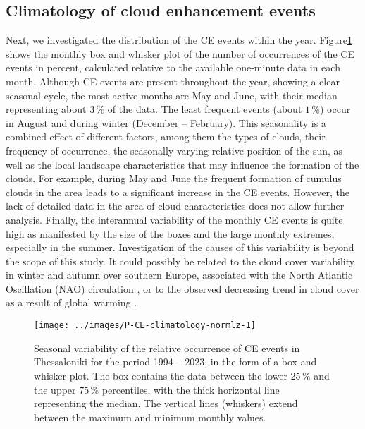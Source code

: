 \documentclass[preprint, 5p,
authoryear]{elsarticle} %
\begin{document}
\hypertarget{climatology-of-cloud-enhancement-events}{%
\subsection{Climatology of cloud enhancement
events}\label{climatology-of-cloud-enhancement-events}}

Next, we investigated the distribution of the CE events within the year.
Figure\nobreakspace{}\ref{fig:relative-month-occurrences} shows the
monthly box and whisker plot of the number of occurrences of the CE
events in percent, calculated relative to the available one-minute data
in each month. Although CE events are present throughout the year,
showing a clear seasonal cycle, the most active months are May and June,
with their median representing about \(3\,\%\) of the data. The least
frequent events (about \(1\,\%\)) occur in August and during winter
(December -- February). This seasonality is a combined effect of
different factors, among them the types of clouds, their frequency of
occurrence, the seasonally varying relative position of the sun, as well
as the local landscape characteristics that may influence the formation
of the clouds. For example, during May and June the frequent formation
of cumulus clouds in the area leads to a significant increase in the CE
events. However, the lack of detailed data in the area of cloud
characteristics does not allow further analysis. Finally, the
interannual variability of the monthly CE events is quite high as
manifested by the size of the boxes and the large monthly extremes,
especially in the summer. Investigation of the causes of this
variability is beyond the scope of this study. It could possibly be
related to the cloud cover variability in winter and autumn over
southern Europe, associated with the North Atlantic Oscillation (NAO)
circulation \citep{Chiacchio2010}, or to the observed decreasing trend
in cloud cover as a result of global warming
\citep[e.g.,][]{SanchezLorenzo2017}.

\begin{figure}

{\centering \texttt{[image: ../images/P-CE-climatology-normlz-1]} 

}

\caption{Seasonal variability of the relative occurrence of CE events in Thessaloniki for the period 1994 -- 2023, in the form of a box and whisker plot. The box contains the data between the lower $25\,\%$ and the upper $75\,\%$ percentiles, with the thick horizontal line representing the median. The vertical lines (whiskers) extend between the maximum and minimum monthly values.}\label{fig:relative-month-occurrences}
\end{figure}
\end{document}
